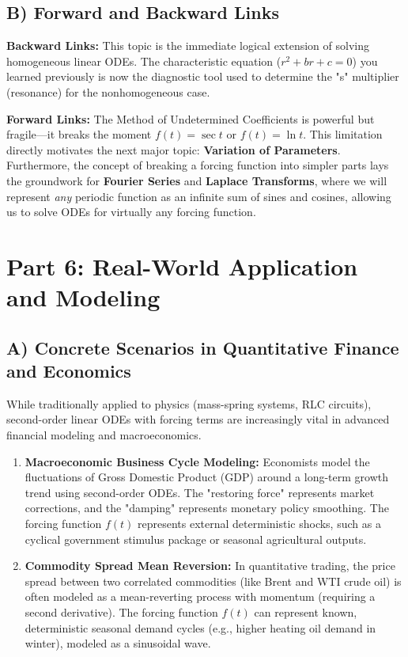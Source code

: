 \documentclass[12pt]{article}
\begin{document}
\subsection{B) Forward and Backward Links}
\textbf{Backward Links:} This topic is the immediate logical extension of solving homogeneous linear ODEs. The characteristic equation ($r^2 + br + c = 0$) you learned previously is now the diagnostic tool used to determine the "s" multiplier (resonance) for the nonhomogeneous case.

\textbf{Forward Links:} The Method of Undetermined Coefficients is powerful but fragile—it breaks the moment $f(t) = \sec t$ or $f(t) = \ln t$. This limitation directly motivates the next major topic: \textbf{Variation of Parameters}. Furthermore, the concept of breaking a forcing function into simpler parts lays the groundwork for \textbf{Fourier Series} and \textbf{Laplace Transforms}, where we will represent \textit{any} periodic function as an infinite sum of sines and cosines, allowing us to solve ODEs for virtually any forcing function.

\newpage
\section{Part 6: Real-World Application and Modeling}

\subsection{A) Concrete Scenarios in Quantitative Finance and Economics}
While traditionally applied to physics (mass-spring systems, RLC circuits), second-order linear ODEs with forcing terms are increasingly vital in advanced financial modeling and macroeconomics.

\begin{enumerate}
    \item \textbf{Macroeconomic Business Cycle Modeling:} Economists model the fluctuations of Gross Domestic Product (GDP) around a long-term growth trend using second-order ODEs. The "restoring force" represents market corrections, and the "damping" represents monetary policy smoothing. The forcing function $f(t)$ represents external deterministic shocks, such as a cyclical government stimulus package or seasonal agricultural outputs.
    \item \textbf{Commodity Spread Mean Reversion:} In quantitative trading, the price spread between two correlated commodities (like Brent and WTI crude oil) is often modeled as a mean-reverting process with momentum (requiring a second derivative). The forcing function $f(t)$ can represent known, deterministic seasonal demand cycles (e.g., higher heating oil demand in winter), modeled as a sinusoidal wave.
\end{enumerate}
\end{document}

